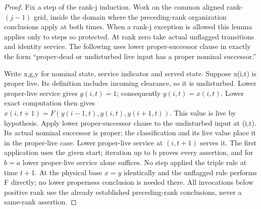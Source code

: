 \begin{proof}
Fix a step of the rank-j induction. Work on the common aligned rank-\((j- 1)\) grid, inside the domain where the preceding-rank organization conclusions apply at both times. When a rank-j exception is allowed this lemma applies only to steps so protected. At rank zero take actual unflagged transitions and identity service. The following uses lower proper-successor clause in exactly the form ``proper-dead or undisturbed live input has a proper nominal successor.''



Write x,g,y for nominal state, service indicator and served state. Suppose x(i,t) is proper live. Its definition includes incoming clearance, so it is undisturbed. Lower proper-live service gives \(g(i,t)=1\); consequently \(y(i,t)=x(i,t)\). Lower exact computation then gives \(x(i,t+1)=F(y(i- 1,t),y(i,t),y(i+1,t))\). This value is live by hypothesis. Apply lower proper-successor clause to the undisturbed input at (i,t). Its actual nominal successor is proper; the classification and its live value place it in the proper-live case. Lower proper-live service at \((i,t+1)\) serves it. The first application uses the given start; iteration up to b proves every assertion, and for \(b=a\) lower proper-live service alone suffices. No step applied the triple rule at time \(t+1\). At the physical base \(x=y\) identically and the unflagged rule performs F directly; no lower properness conclusion is needed there. All invocations below positive rank use the already established preceding-rank conclusions, never a same-rank assertion.


\end{proof}
